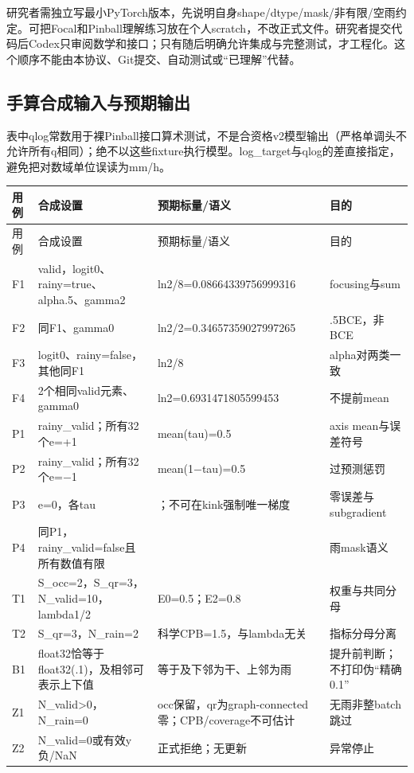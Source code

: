 \documentclass[UTF8,fontset=fandol,10pt]{ctexart}
\begin{document}
研究者需独立写最小PyTorch版本，先说明自身shape/\allowbreak{}dtype/\allowbreak{}mask/\allowbreak{}非有限/\allowbreak{}空雨约定。可把Focal和Pinball理解练习放在个人scratch，不改正式文件。研究者提交代码后Codex只审阅数学和接口；只有随后明确允许集成与完整测试，才工程化。这个顺序不能由本协议、Git提交、自动测试或“已理解”代替。

\subsection{手算合成输入与预期输出}

表中qlog常数用于裸Pinball接口算术测试，不是合资格v2模型输出（严格单调头不允许所有q相同）；绝不以这些fixture执行模型。log\_\allowbreak{}target与qlog的差直接指定，避免把对数域单位误读为mm/\allowbreak{}h。

\begingroup\small\setlength{\tabcolsep}{3pt}\renewcommand{\arraystretch}{1.12}
\begin{longtable}{>{\raggedright\arraybackslash}p{\dimexpr(\linewidth-8\tabcolsep)/4\relax}>{\raggedright\arraybackslash}p{\dimexpr(\linewidth-8\tabcolsep)/4\relax}>{\raggedright\arraybackslash}p{\dimexpr(\linewidth-8\tabcolsep)/4\relax}>{\raggedright\arraybackslash}p{\dimexpr(\linewidth-8\tabcolsep)/4\relax}}
\toprule
用例 & 合成设置 & 预期标量/\allowbreak{}语义 & 目的 \\
\midrule\endfirsthead
用例 & 合成设置 & 预期标量/\allowbreak{}语义 & 目的 \\
\midrule\endhead
F1 & 1 valid，logit0、rainy=true、alpha.5、gamma2 & ln2/\allowbreak{}8=0.08664339756999316 & focusing与sum \\
F2 & 同F1、gamma0 & ln2/\allowbreak{}2=0.34657359027997265 & .5BCE，非BCE \\
F3 & logit0、rainy=false，其他同F1 & ln2/\allowbreak{}8 & alpha对两类一致 \\
F4 & 2个相同valid元素、gamma0 & ln2=0.6931471805599453 & 不提前mean \\
P1 & 1 rainy\_\allowbreak{}valid；所有32个e=+1 & mean(tau)=0.5 & axis mean与误差符号 \\
P2 & 1 rainy\_\allowbreak{}valid；所有32个e=\(-\)1 & mean(1\(-\)tau)=0.5 & 过预测惩罚 \\
P3 & e=0，各tau & 0；不可在kink强制唯一梯度 & 零误差与subgradient \\
P4 & 同P1，rainy\_\allowbreak{}valid=false且所有数值有限 & 0 & 雨mask语义 \\
T1 & S\_\allowbreak{}occ=2，S\_\allowbreak{}qr=3，N\_\allowbreak{}valid=10，lambda1/\allowbreak{}2 & E0=0.5；E2=0.8 & 权重与共同分母 \\
T2 & S\_\allowbreak{}qr=3，N\_\allowbreak{}rain=2 & 科学CPB=1.5，与lambda无关 & 指标分母分离 \\
B1 & float32恰等于float32(.1)，及相邻可表示上下值 & 等于及下邻为干、上邻为雨 & 提升前判断；不打印伪“精确0.1” \\
Z1 & N\_\allowbreak{}valid>0，N\_\allowbreak{}rain=0 & occ保留，qr为graph-connected零；CPB/\allowbreak{}coverage不可估计 & 无雨非整batch跳过 \\
Z2 & N\_\allowbreak{}valid=0或有效y负/\allowbreak{}NaN & 正式拒绝；无更新 & 异常停止 \\
\bottomrule\end{longtable}\endgroup
\end{document}
